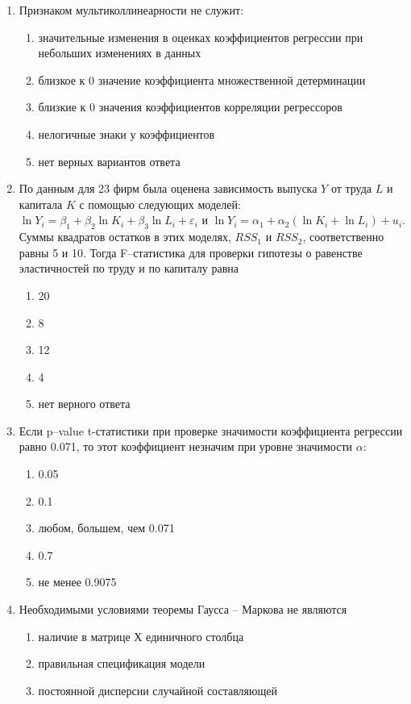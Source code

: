 \begin{enumerate}
\item Признаком мультиколлинеарности не служит:
    \begin{enumerate}
    \item значительные изменения в оценках коэффициентов регрессии при небольших изменениях в данных
	\item близкое к 0 значение коэффициента множественной детерминации
	\item близкие к 0 значения коэффициентов корреляции регрессоров
	\item нелогичные знаки у коэффициентов
	\item нет верных вариантов ответа
    \end{enumerate}
\item По данным для 23 фирм была оценена зависимость выпуска $Y$ от труда $L$ и капитала $K$ с помощью следующих моделей: $\ln Y_i = \beta_1 + \beta_2 \ln K_i + \beta_3 \ln L_i + \varepsilon_i$ и $\ln Y_i = \alpha_1 + \alpha_2 (\ln K_i + \ln L_i) + u_i$. Суммы квадратов остатков в этих моделях, $RSS_1$ и $RSS_2$, соответственно равны 5 и 10. Тогда F–статистика для проверки гипотезы о равенстве эластичностей по труду и по капиталу  равна
	\begin{enumerate}
	\item 20
	\item 8
	\item 12
	\item 4
	\item нет верного ответа
	\end{enumerate}
\item Если p–value t-статистики при проверке значимости коэффициента регрессии равно 0.071, то этот коэффициент незначим при уровне значимости $\alpha$:
	\begin{enumerate}
	\item 0.05
	\item 0.1
	\item любом, большем, чем 0.071
	\item 0.7
	\item не менее 0.9075
	\end{enumerate}
\item Необходимыми условиями теоремы Гаусса – Маркова не являются
	\begin{enumerate}
	\item наличие в матрице Х единичного столбца
	\item правильная спецификация модели  
	\item постоянной дисперсии случайной составляющей

\end{enumerate}
\end{enumerate}
